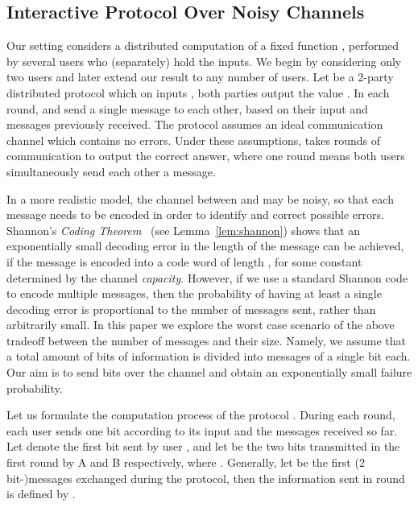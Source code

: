 \documentclass[ letterpaper, 11pt]{article}
\begin{document}
\subsection{Interactive Protocol Over Noisy Channels}
Our setting considers a distributed computation of a fixed function , performed by several
users who (separately) hold the inputs. We begin by considering only two users and later
extend our result to any number of users.
Let  be a 2-party distributed protocol
which on inputs , both parties output the value .
In each round,  and  send a single message to each other, based on their input and
messages previously received. The protocol  assumes an ideal communication channel which
contains no errors. Under these assumptions,  takes  rounds of communication to output the correct answer, where one round means both users simultaneously send each other a message.

In a more realistic model, the channel between  and  may be noisy, so that each message
needs to be encoded in order to identify and correct possible errors.
Shannon's \emph{Coding Theorem}~\cite{shannon48} (see Lemma~\ref{lem:shannon})
shows that an exponentially small decoding error in the length of the message 
can be achieved, if the message is encoded into a code word of length ,
for some constant 
determined by the channel \emph{capacity}.
However, if we use a standard Shannon code to encode multiple messages,
then the probability of having at least a single decoding error
is proportional to the number of messages sent, rather than arbitrarily small.
In this paper we explore the worst case scenario of the above tradeoff between the
number of messages and their size.
Namely, we assume that a total amount of  bits of information  is divided into
 messages of a single bit each. Our aim is to send  bits over the channel
and obtain an exponentially small failure probability.


Let us formulate the computation process of the protocol .
During each round, each user  sends one bit according to
its input  and the messages received so far. Let 
denote the  first bit sent by user , and let  be the
two bits transmitted in the first round by A and B respectively, where .
Generally, let  be the first  (2 bit-)messages exchanged during the protocol, then the information sent in round 
is defined by .
\end{document}
